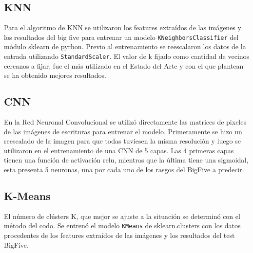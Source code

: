 \documentclass[10pt, a4paper]{article}
\begin{document}
        \subsection{KNN}
            Para el algoritmo de KNN se utilizaron los features extra\'idos de las im\'agenes y los resultados del big five para entrenar un modelo \texttt{KNeighborsClassifier} del m\'odulo sklearn de pyrhon. 
            Previo al entrenamiento se reescalaron los datos de la entrada utilizando \texttt{StandardScaler}. El valor de k fijado como cantidad de vecinos cercanos a fijar, fue el m\'as utilizado en el Estado del Arte y
            con el que plantean se ha obtenido mejores resultados.
        
            \subsection{CNN}
            En la Red Neuronal Convolucional se utiliz\'o directamente las matrices de pixeles de las im\'agenes de escrituras para entrenar el modelo. 
            Primeramente se hizo un reescalado de la imagen para que todas tuviesen la misma resoluci\'on y luego se utilizaron en el entrenamiento de una CNN de 5 capas.
            Las 4 primeras capas tienen una funci\'on de activaci\'on relu, mientras que la \'ultima tiene una sigmoidal, esta presenta 5 neuronas, una por cada uno de los rasgos del BigFive a predecir.

        \subsection{K-Means}
            El n\'umero de cl\'usters K, que mejor se ajuste a la situaci\'on se determin\'o con el m\'etodo del codo. Se entren\'o el 
            modelo \texttt{KMeans} de sklearn.clusters con los datos procedentes de los features extra\'idos de las im\'agenes y los resultados del 
            test BigFive.
        
\end{document}
